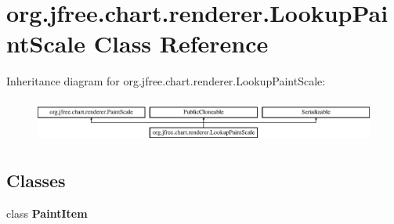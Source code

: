 \hypertarget{classorg_1_1jfree_1_1chart_1_1renderer_1_1_lookup_paint_scale}{}\section{org.\+jfree.\+chart.\+renderer.\+Lookup\+Paint\+Scale Class Reference}
\label{classorg_1_1jfree_1_1chart_1_1renderer_1_1_lookup_paint_scale}
Inheritance diagram for org.\+jfree.\+chart.\+renderer.\+Lookup\+Paint\+Scale\+:\begin{figure}[H]
\begin{center}
\leavevmode
\includegraphics[height=1.430396cm]{classorg_1_1jfree_1_1chart_1_1renderer_1_1_lookup_paint_scale}
\end{center}
\end{figure}
\subsection*{Classes}
\begin{DoxyCompactItemize}
\item 
class {\bfseries Paint\+Item}
\end{DoxyCompactItemize}
